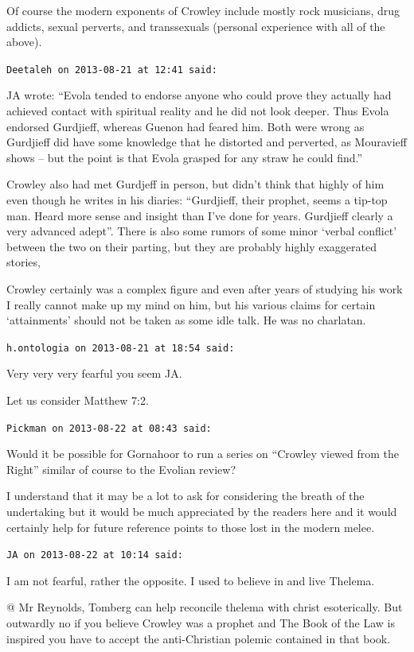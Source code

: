 \begin{footnotesize}
\begin{sffamily}
Of course the modern exponents of Crowley include mostly rock musicians, drug addicts, sexual perverts, and transsexuals (personal experience with all of the above).

\hfill

\texttt{Deetaleh on 2013-08-21 at 12:41 said:}

JA wrote: ``Evola tended to endorse anyone who could prove they actually had achieved contact with spiritual reality and he did not look deeper. Thus Evola endorsed Gurdjieff, whereas Guenon had feared him. Both were wrong as Gurdjieff did have some knowledge that he distorted and perverted, as Mouravieff shows -- but the point is that Evola grasped for any straw he could find.''

Crowley also had met Gurdjeff in person, but didn't think that highly of him even though he writes in his diaries: ``Gurdjieff, their prophet, seems a tip-top man. Heard more sense and insight than I've done for years. Gurdjieff clearly a very advanced adept''. There is also some rumors of some minor `verbal conflict' between the two on their parting, but they are probably highly exaggerated stories,

Crowley certainly was a complex figure and even after years of studying his work I really cannot make up my mind on him, but his various claims for certain `attainments' should not be taken as some idle talk. He was no charlatan.

\hfill

\texttt{h.ontologia on 2013-08-21 at 18:54 said:}

Very very very fearful you seem JA.

Let us consider Matthew 7:2.

\hfill

\texttt{Pickman on 2013-08-22 at 08:43 said:}

Would it be possible for Gornahoor to run a series on ``Crowley viewed from the Right'' similar of course to the Evolian review?

I understand that it may be a lot to ask for considering the breath of the undertaking but it would be much appreciated by the readers here and it would certainly help for future reference points to those lost in the modern melee.

\hfill

\texttt{JA on 2013-08-22 at 10:14 said:}

I am not fearful, rather the opposite. I used to believe in and live Thelema.

@ Mr Reynolds, Tomberg can help reconcile thelema with christ esoterically. But outwardly no if you believe Crowley was a prophet and The Book of the Law is inspired you have to accept the anti-Christian polemic contained in that book.


\end{sffamily}
\end{footnotesize}
